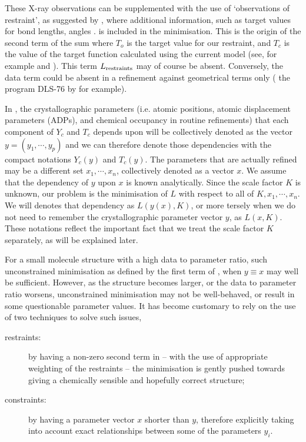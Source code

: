 \documentclass[pdf]{iucr}
\begin{document}
These X-ray observations can be supplemented with the use of `observations of restraint', as suggested by , where additional information, such as target values for bond lengths, angles . is included in the minimisation. This is the origin of the second term of the sum where $T_o$ is the target value for our restraint, and $T_c$ is the value of the target function calculated using the current model (see, for example  and ). This term $L_{\text{restraints}}$ may of course be absent. Conversely, the data term could be absent in a refinement against geometrical terms only ( the program DLS-76 by  for example).

In , the crystallographic parameters (i.e. atomic positions, atomic displacement parameters (ADPs), and chemical occupancy in routine refinements) that each component of $Y_c$ and $T_c$ depends upon will be collectively denoted as the vector $y=(y_1, \cdots, y_p)$ and we can therefore denote those dependencies with the compact notations $Y_c(y)$ and $T_c(y)$. The parameters that are actually refined may be a different set $x_1, \cdots, x_n$, collectively denoted as a vector $x$. We assume that the dependency of $y$ upon $x$ is known analytically. Since the scale factor $K$ is unknown, our problem is the minimisation of $L$ with respect to all of $K, x_1, \cdots, x_n$. We will  denotes that dependency as $L(y(x), K)$, or more tersely when we do not need to remember the crystallographic parameter vector $y$, as $L(x, K)$. These notations reflect the important fact that we treat the scale factor $K$ separately, as will be explained later.

For a small molecule structure with a high data to parameter ratio, such unconstrained minimisation as defined by the first term of , when $y \equiv x$ may well be sufficient. However, as the structure becomes larger, or the data to parameter ratio worsens, unconstrained minimisation may not be well-behaved, or result in some questionable parameter values. It has become customary to rely on the use of two techniques to solve such issues,
\begin{description}
\item[restraints:] by having a non-zero second term in  -- with the use of appropriate weighting of the restraints -- the minimisation is gently pushed towards giving a chemically sensible and hopefully correct structure;
\item[constraints:] by having a parameter vector $x$ shorter than $y$, therefore explicitly taking into account exact relationships between some of the parameters $y_i$.
\end{description}
\end{document}
